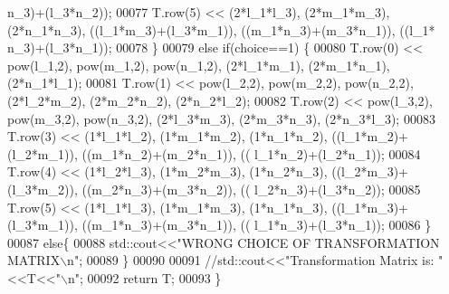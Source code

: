 \begin{DoxyCode}
      n\_3)+(l\_3*n\_2));
00077     T.row(5) << (2*l\_1*l\_3), (2*m\_1*m\_3), (2*n\_1*n\_3), ((l\_1*m\_3)+(l\_3*m\_1)), ((m\_1*n\_3)+(m\_3*n\_1)), ((l\_1*
      n\_3)+(l\_3*n\_1));
00078     \}
00079     \textcolor{keywordflow}{else} \textcolor{keywordflow}{if}(choice==1) \{
00080     T.row(0) << pow(l\_1,2), pow(m\_1,2), pow(n\_1,2), (2*l\_1*m\_1), (2*m\_1*n\_1), (2*n\_1*l\_1);
00081         T.row(1) << pow(l\_2,2), pow(m\_2,2), pow(n\_2,2), (2*l\_2*m\_2), (2*m\_2*n\_2), (2*n\_2*l\_2);
00082         T.row(2) << pow(l\_3,2), pow(m\_3,2), pow(n\_3,2), (2*l\_3*m\_3), (2*m\_3*n\_3), (2*n\_3*l\_3);
00083         T.row(3) << (1*l\_1*l\_2), (1*m\_1*m\_2), (1*n\_1*n\_2), ((l\_1*m\_2)+(l\_2*m\_1)), ((m\_1*n\_2)+(m\_2*n\_1)), ((
      l\_1*n\_2)+(l\_2*n\_1));
00084         T.row(4) << (1*l\_2*l\_3), (1*m\_2*m\_3), (1*n\_2*n\_3), ((l\_2*m\_3)+(l\_3*m\_2)), ((m\_2*n\_3)+(m\_3*n\_2)), ((
      l\_2*n\_3)+(l\_3*n\_2));
00085         T.row(5) << (1*l\_1*l\_3), (1*m\_1*m\_3), (1*n\_1*n\_3), ((l\_1*m\_3)+(l\_3*m\_1)), ((m\_1*n\_3)+(m\_3*n\_1)), ((
      l\_1*n\_3)+(l\_3*n\_1));
00086     \}
00087     \textcolor{keywordflow}{else}\{
00088         std::cout<<\textcolor{stringliteral}{"WRONG CHOICE OF TRANSFORMATION MATRIX\(\backslash\)n"};
00089     \}
00090     
00091     \textcolor{comment}{//std::cout<<"Transformation Matrix is: "<<T<<"\(\backslash\)n";}
00092     \textcolor{keywordflow}{return} T;
00093 \}
\end{DoxyCode}
